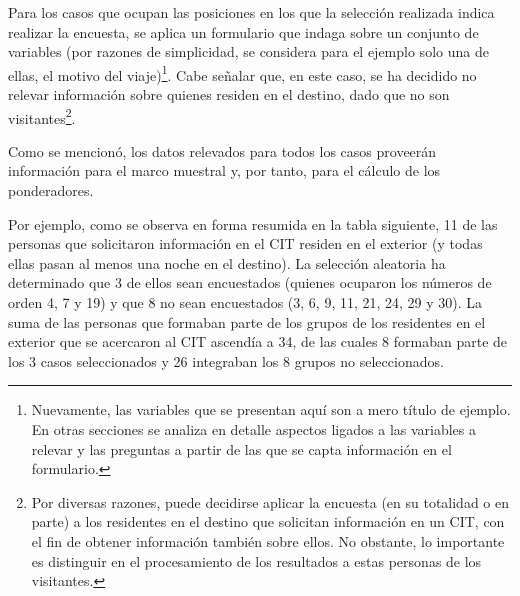 \documentclass[
]{book}
\begin{document}
Para los casos que ocupan las posiciones en los que la selección realizada indica realizar la encuesta, se aplica un formulario que indaga sobre un conjunto de variables (por razones de simplicidad, se considera para el ejemplo solo una de ellas, el motivo del viaje)\footnote{Nuevamente, las variables que se presentan aquí son a mero título de ejemplo. En otras secciones se analiza en detalle aspectos ligados a las variables a relevar y las preguntas a partir de las que se capta información en el formulario.}. Cabe señalar que, en este caso, se ha decidido no relevar información sobre quienes residen en el destino, dado que no son visitantes\footnote{Por diversas razones, puede decidirse aplicar la encuesta (en su totalidad o en parte) a los residentes en el destino que solicitan información en un CIT, con el fin de obtener información también sobre ellos. No obstante, lo importante es distinguir en el procesamiento de los resultados a estas personas de los visitantes.}.

Como se mencionó, los datos relevados para todos los casos proveerán información para el marco muestral y, por tanto, para el cálculo de los ponderadores.

Por ejemplo, como se observa en forma resumida en la tabla siguiente, 11 de las personas que solicitaron información en el CIT residen en el exterior (y todas ellas pasan al menos una noche en el destino). La selección aleatoria ha determinado que 3 de ellos sean encuestados (quienes ocuparon los números de orden 4, 7 y 19) y que 8 no sean encuestados (3, 6, 9, 11, 21, 24, 29 y 30). La suma de las personas que formaban parte de los grupos de los residentes en el exterior que se acercaron al CIT ascendía a 34, de las cuales 8 formaban parte de los 3 casos seleccionados y 26 integraban los 8 grupos no seleccionados.
\end{document}
